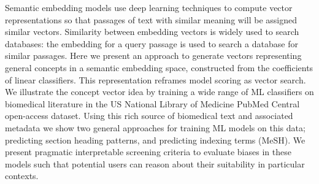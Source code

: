 Semantic embedding models use deep learning techniques to compute vector representations so that passages of text with similar meaning will be assigned similar vectors. Similarity between embedding vectors is widely used to search databases: the embedding for a query passage is used to search a database for similar passages. Here we present an approach to generate vectors representing general concepts in a semantic embedding space, constructed from the coefficients of linear classifiers. This representation reframes model scoring as vector search. We illustrate the concept vector idea by training a wide range of ML classifiers on biomedical literature in the US National Library of Medicine PubMed Central open-access dataset. Using this rich source of biomedical text and associated metadata we show two general approaches for training ML models on this data; predicting section heading patterns, and predicting indexing terms (MeSH). We present pragmatic interpretable screening criteria to evaluate biases in these models such that potential users can reason about their suitability in particular contexts.